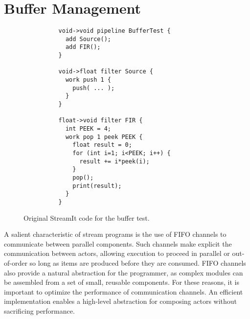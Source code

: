 \section{Buffer Management}
\label{sec:buffer}

\begin{figure}[t]

\centering
{\small
\begin{verbatim}
          void->void pipeline BufferTest {
            add Source();                 
            add FIR();                    
          }                               
                                          
          void->float filter Source {     
            work push 1 {                 
              push( ... );             
            } 
          }                               
                                          
          float->void filter FIR {        
            int PEEK = 4;                 
            work pop 1 peek PEEK {        
              float result = 0;           
              for (int i=1; i<PEEK; i++) {
                result += i*peek(i);      
              }                           
              pop();                      
              print(result);              
            }                             
          }                               
\end{verbatim}}
\vspace{-6pt}
\caption{Original StreamIt code for the buffer test.\protect\label{fig:code-orig}}
\end{figure}

A salient characteristic of stream programs is the use of FIFO
channels to communicate between parallel components.  Such channels
make explicit the communication between actors, allowing execution to
proceed in parallel or out-of-order so long as items are produced
before they are consumed.  FIFO channels also provide a natural
abstraction for the programmer, as complex modules can be assembled
from a set of small, reusable components.  For these reasons, it is
important to optimize the performance of communication channels.  An
efficient implementation enables a high-level abstraction for
composing actors without sacrificing performance.

